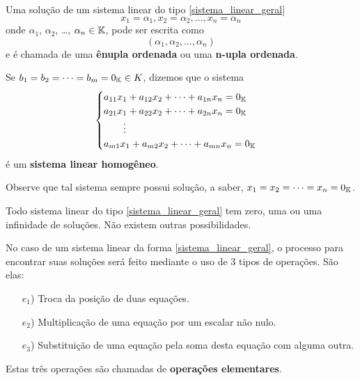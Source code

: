 \documentclass{beamer}
\begin{document}
    \begin{frame}
        \vspace{.3cm}

        Uma solução de um sistema linear do tipo \eqref{sistema_linear_geral}
        \[
            x_1 = \alpha_1, x_2 = \alpha_2, \dots, x_n = \alpha_n
        \]
        onde $\alpha_1$, $\alpha_2$, \dots, $\alpha_n \in \mathbb{K}$, pode ser escrita como
        \[
            (\alpha_1, \alpha_2, \dots, \alpha_n)
        \]
        e é chamada de uma \textbf{ênupla ordenada} ou uma \textbf{n-upla ordenada}.
    \end{frame}

    \begin{frame}
        Se $b_1 = b_2 = \cdots = b_m = 0_{\mathbb{K}} \in K$, dizemos que o sistema
        \begin{equation}\label{sistemalinearhomogeneo}\index{Sistema Linear}
            \begin{cases}
                a_{11}x_1 + a_{12}x_2 + \cdots + a_{1n}x_n = 0_\cp{K}\\
                a_{21}x_1 + a_{22}x_2 + \cdots + a_{2n}x_n = 0_\cp{K}\\
                \qquad \vdots\\
                a_{m1}x_1 + a_{m2}x_2 + \cdots + a_{mn}x_n = 0_\cp{K}
            \end{cases}
        \end{equation}
        \'e um \textbf{sistema linear homog\^eneo}. 

        \vspace{.3cm}

        Observe que tal sistema sempre possui solu\c{c}\~ao, a saber, $x_1 = x_2 = \cdots = x_n = 0_{\mathbb{K}}$.
    \end{frame}

    \begin{frame}
        \begin{teorema}
            Todo sistema linear do tipo \eqref{sistema_linear_geral} tem zero, uma ou uma infinidade de soluções. Não existem outras possibilidades.
        \end{teorema}
    \end{frame}

    \begin{frame}
        No caso de um sistema linear da forma \eqref{sistema_linear_geral}, o processo para encontrar suas soluções ser\'a feito mediante o uso de 3 tipos de opera\c{c}\~oes. S\~ao elas:
        \begin{itemize}
	    \item[$e_1$)] Troca da posi\c{c}\~ao de duas equa\c{c}\~oes.
	    \item[$e_2$)] Multiplica\c{c}\~ao de uma equa\c{c}\~ao por um escalar n\~ao nulo.
	    \item[$e_3$)] Substitui\c{c}\~ao de uma equa\c{c}\~ao pela soma desta equa\c{c}\~ao com alguma outra.
        \end{itemize}

        Estas tr\^es opera\c{c}\~oes s\~ao chamadas de \textbf{opera\c{c}\~oes elementares}.
    \end{frame}
\end{document}
